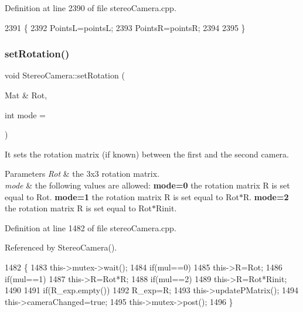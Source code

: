Definition at line 2390 of file stereo\+Camera.\+cpp.


\begin{DoxyCode}
2391 \{
2392     PointsL=pointsL;
2393     PointsR=pointsR;
2394 
2395 \}
\end{DoxyCode}
\mbox{\label{classStereoCamera_a1329b3894d527e1505618f57a1304624}} 
\subsubsection{\texorpdfstring{set\+Rotation()}{setRotation()}}
{\footnotesize\ttfamily void Stereo\+Camera\+::set\+Rotation (\begin{DoxyParamCaption}\item[{Mat \&}]{Rot,  }\item[{int}]{mode = {} }\end{DoxyParamCaption})}



It sets the rotation matrix (if known) between the first and the second camera. 


\begin{DoxyParams}{Parameters}
{\em Rot} & the 3x3 rotation matrix. \\
\hline
{\em mode} & the following values are allowed\+: {\bfseries mode=0} the rotation matrix R is set equal to Rot. {\bfseries mode=1} the rotation matrix R is set equal to Rot$\ast$R. {\bfseries mode=2} the rotation matrix R is set equal to Rot$\ast$\+Rinit. \\
\hline
\end{DoxyParams}


Definition at line 1482 of file stereo\+Camera.\+cpp.



Referenced by Stereo\+Camera().


\begin{DoxyCode}
1482                                                 \{
1483     this->mutex->wait();
1484     \textcolor{keywordflow}{if}(mul==0)
1485         this->R=Rot;
1486     \textcolor{keywordflow}{if}(mul==1)
1487         this->R=Rot*R;
1488     \textcolor{keywordflow}{if}(mul==2)
1489         this->R=Rot*Rinit;
1490 
1491     \textcolor{keywordflow}{if}(R\_exp.empty())
1492         R\_exp=R;
1493     this->updatePMatrix();
1494     this->cameraChanged=\textcolor{keyword}{true};
1495     this->mutex->post();
1496 \}
\end{DoxyCode}
\mbox{\label{classStereoCamera_a7b10f1218e8e70f47b22080ba1820d39}} 
